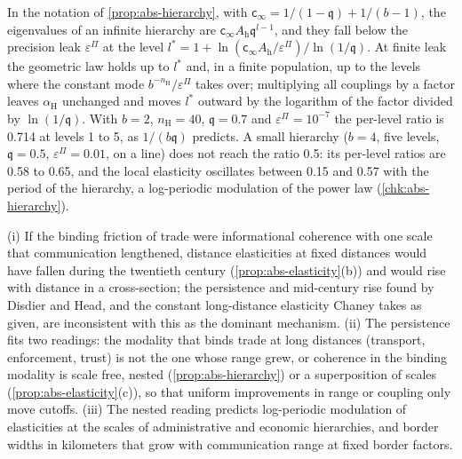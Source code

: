 \begin{remark}\label{rem:abs-cutoff}
In the notation of \cref{prop:abs-hierarchy}, with $\mathsf c_\infty=1/(1-\mathfrak q)+1/(b-1)$, the eigenvalues of an infinite hierarchy are $\mathsf c_\infty A_{\mathrm h}\mathfrak q^{l-1}$, and they fall below the precision leak $\varepsilon^\Pi$ at the level $l^\ast=1+\ln(\mathsf c_\infty A_{\mathrm h}/\varepsilon^\Pi)/\ln(1/\mathfrak q)$. At finite leak the geometric law holds up to $l^\ast$ and, in a finite population, up to the levels where the constant mode $b^{-n_{\mathrm H}}/\varepsilon^\Pi$ takes over; multiplying all couplings by a factor leaves $\alpha_{\mathrm H}$ unchanged and moves $l^\ast$ outward by the logarithm of the factor divided by $\ln(1/\mathfrak q)$. With $b=2$, $n_{\mathrm H}=40$, $\mathfrak q=0.7$ and $\varepsilon^\Pi=10^{-7}$ the per-level ratio is 0.714 at levels 1 to 5, as $1/(b\mathfrak q)$ predicts. A small hierarchy ($b=4$, five levels, $\mathfrak q=0.5$, $\varepsilon^\Pi=0.01$, on a line) does not reach the ratio 0.5: its per-level ratios are 0.58 to 0.65, and the local elasticity oscillates between 0.15 and 0.57 with the period of the hierarchy, a log-periodic modulation of the power law (\cref{chk:abs-hierarchy}).
\end{remark}

\begin{conjecture}\label{conj:abs-distance}
(i) If the binding friction of trade were informational coherence with one scale that communication lengthened, distance elasticities at fixed distances would have fallen during the twentieth century (\cref{prop:abs-elasticity}(b)) and would rise with distance in a cross-section; the persistence and mid-century rise found by Disdier and Head, and the constant long-distance elasticity Chaney takes as given, are inconsistent with this as the dominant mechanism. (ii) The persistence fits two readings: the modality that binds trade at long distances (transport, enforcement, trust) is not the one whose range grew, or coherence in the binding modality is scale free, nested (\cref{prop:abs-hierarchy}) or a superposition of scales (\cref{prop:abs-elasticity}(c)), so that uniform improvements in range or coupling only move cutoffs. (iii) The nested reading predicts log-periodic modulation of elasticities at the scales of administrative and economic hierarchies, and border widths in kilometers that grow with communication range at fixed border factors.
\end{conjecture}

